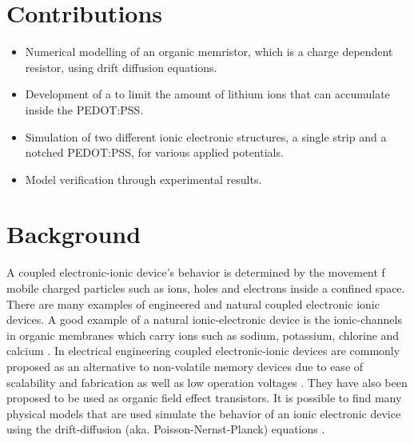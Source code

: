 \begin{doublespace}
\section{Contributions}

\begin{itemize}
  \item Numerical modelling of an organic memristor, which is a charge dependent resistor, using drift diffusion equations.  
  \item Development of a  to  limit the amount of lithium ions that can accumulate inside the PEDOT:PSS.
  \item Simulation of two different ionic electronic structures, a single strip and a notched PEDOT:PSS, for various applied potentials.
  \item Model verification through experimental results.
\end{itemize}

\section{Background}

A coupled electronic-ionic device's behavior is determined by the movement f mobile charged particles such as ions, holes and electrons inside a confined space. There are many examples of engineered and natural coupled electronic ionic devices. A good example of a natural ionic-electronic device is the ionic-channels in organic membranes which carry ions such as sodium, potassium, chlorine and calcium \cite{electrodiff}\cite{GramacidinChannel}. In electrical engineering coupled electronic-ionic devices are commonly proposed as an alternative to non-volatile memory devices due to ease of scalability and fabrication as well as low operation voltages \cite{IonicMemoryDev}\cite{NanoScaleMemEle}. They have also been proposed to be used as organic field effect transistors\cite{OrganicFet}. It is possible to find many physical models that are used simulate the behavior of an ionic electronic device using the drift-diffusion (aka. Poisson-Nernst-Planck) equations \cite{IonicMemoryDev}\cite{OrganicMemSim}\cite{NumericalPNP}.


\end{doublespace}
